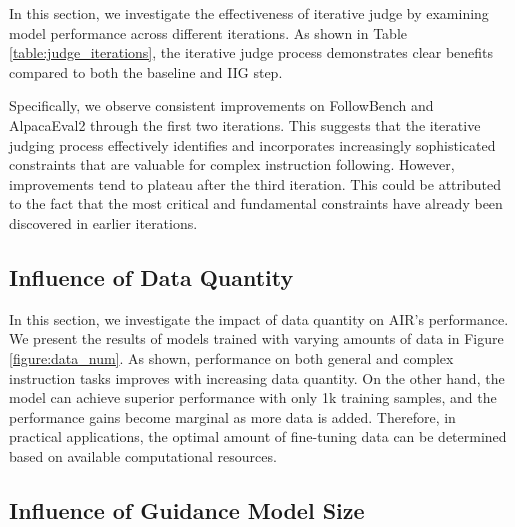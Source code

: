 In this section, we investigate the effectiveness of iterative judge by examining model performance across different iterations. As shown in Table \ref{table:judge_iterations}, the iterative judge process demonstrates clear benefits compared to both the baseline and IIG step.

Specifically, we observe consistent improvements on FollowBench and AlpacaEval2 through the first two iterations. This suggests that the iterative judging process effectively identifies and incorporates increasingly sophisticated constraints that are valuable for complex instruction following. However, improvements tend to plateau after the third iteration. This could be attributed to the fact that the most critical and fundamental constraints have already been discovered in earlier iterations.




\subsection{Influence of Data Quantity}

\indent In this section, we investigate the impact of data quantity on AIR's performance. We present the results of models trained with varying amounts of data in Figure \ref{figure:data_num}. As shown, performance on both general and complex instruction tasks improves with increasing data quantity. On the other hand, the model can achieve superior performance with only 1k training samples, and the performance gains become marginal as more data is added. Therefore, in practical applications, the optimal amount of fine-tuning data can be determined based on available computational resources.

\subsection{Influence of Guidance Model Size}



